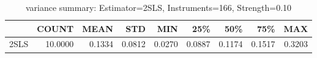 \begin{table}[ht]
\centering
\caption{variance summary: Estimator=2SLS, Instruments=166, Strength=0.10}
\begin{tabular}{lrrrrrrrr}
\toprule
 & COUNT & MEAN & STD & MIN & 25\% & 50\% & 75\% & MAX \\
\midrule
2SLS & 10.0000 & 0.1334 & 0.0812 & 0.0270 & 0.0887 & 0.1174 & 0.1517 & 0.3203 \\
\bottomrule
\end{tabular}
\end{table}
